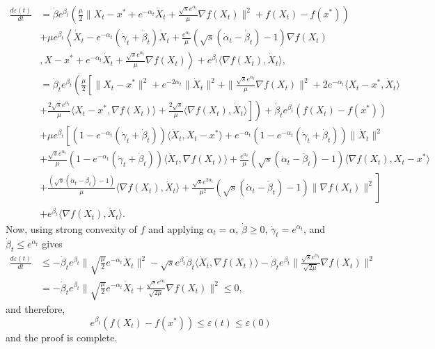 \documentclass{article}
\theoremstyle{plain}
\theoremstyle{definition}
\theoremstyle{remark}
\begin{document}
    \begin{align}\label{thm32_eqn_3}
        \frac{d\varepsilon(t)}{dt}&=\dot \beta e^{\beta_t}\left(\frac{\mu}{2}\|X_t-x^*+e^{-\alpha_t}\dot X_t+\frac{\sqrt{s}e^{\alpha_t}}{\mu}\nabla f(X_t)\|^2+f(X_t)-f(x^*)\right)\nonumber\\
       & + \mu e^{\beta_t}\left\langle \dot X_t-e^{-\alpha_t}(\dot \gamma_t+\dot \beta_t)\dot X_t  +\frac{e^{\alpha_t }}{\mu}(\sqrt{s}(\dot \alpha_t-\dot \beta_t)-1)\nabla f(X_t)\right.\nonumber\\
       &\left. ,X-x^*+e^{-\alpha_t}\dot X_t+\frac{\sqrt{s}e^{\alpha_t}}{\mu}\nabla f(X_t)\right\rangle+e^{\beta_t}\langle \nabla f(X_t),\dot X_t \rangle,\nonumber\\
   &= \dot \beta_t e^{\beta_t}\left(\frac{\mu}{2}\left[\|X_t-x^*\|^2+e^{-2\alpha_t}\|\dot X_t\|^2+\|\frac{\sqrt{s}e^{\alpha_t}}{\mu}\nabla f(X_t)\|^2+2e^{-\alpha_t}\langle X_t-x^*,\dot X_t\rangle\right.\right.\nonumber\\
   &\left.\left.+\frac{2\sqrt{s}e^{\alpha_t}}{\mu}\langle X_t-x^*,\nabla f(X_t) \rangle+ \frac{2\sqrt{s}}{\mu}\langle \nabla f(X_t),\dot X_t \rangle\right]\right)+\dot \beta_t e^{\beta_t} (f(X_t)-f(x^*) )\nonumber\\
   & +\mu e^{\beta_t}\left[ (1-e^{-\alpha_t}(\dot \gamma_t+\dot \beta_t))\langle \dot X_t,X_t-x^*\rangle+ e^{-\alpha_t}(1-e^{-\alpha_t}(\dot \gamma_t+\dot \beta_t))\|\dot X_t\|^2 \right.\nonumber\\
   & +\frac{\sqrt{s}e^{\alpha_t}}{\mu}(1-e^{-\alpha_t}(\dot \gamma_t+\dot \beta_t))\langle \dot X_t,\nabla f(X_t) \rangle + \frac{e^{\alpha_t }}{\mu}(\sqrt{s}(\dot \alpha_t-\dot \beta_t)-1)\langle \nabla f(X_t) ,X_t-x^*\rangle\nonumber\\
   & \left.+ \frac{(\sqrt{s}(\dot \alpha_t-\dot \beta_t)-1)}{\mu}\langle \nabla f(X_t),\dot X_t \rangle+\frac{\sqrt{s}e^{2\alpha_t}}{\mu^2}(\sqrt{s}(\dot \alpha_t-\dot \beta_t)-1)\|\nabla f(X_t)\|^2\right]\nonumber\\
   & + e^{\beta_t}\langle \nabla f(X_t),\dot X_t \rangle.
    \end{align}
    Now, using strong convexity of $f$ and applying $ \alpha_t=\alpha$, $\dot \beta\geq 0$, $\dot \gamma_t=e^{\alpha_t}$, and $\dot \beta_t\leq e^{\alpha_t}$ gives
    \begin{align}\label{thm32_eqn_4}
        \frac{d\varepsilon(t)}{dt}&\leq-\dot \beta_t e^{\beta_t}\|\sqrt{\frac{\mu}{2}}e^{-\alpha_t}\dot X_t\|^2-\sqrt{s}e^{\beta_t}\dot \beta_t\langle \dot X_t,\nabla f(X_t) \rangle-\dot \beta_t e^{\beta_t}\|\frac{\sqrt{s}e^{\alpha_t}}{\sqrt{2\mu}}\nabla f(X_t)\|^2\nonumber\\
        &=-\dot \beta_t e^{\beta_t} \|    \sqrt{\frac{\mu}{2}}e^{-\alpha_t}\dot X_t+  \frac{\sqrt{s}e^{\alpha_t}}{\sqrt{2\mu}}\nabla f(X_t)\|^2\leq 0,
    \end{align}
    and therefore, 
    $$e^{\beta_t}(f(X_t)-f(x^*))\leq \varepsilon(t)\leq \varepsilon(0)$$
    and the proof is complete.
\end{document}
